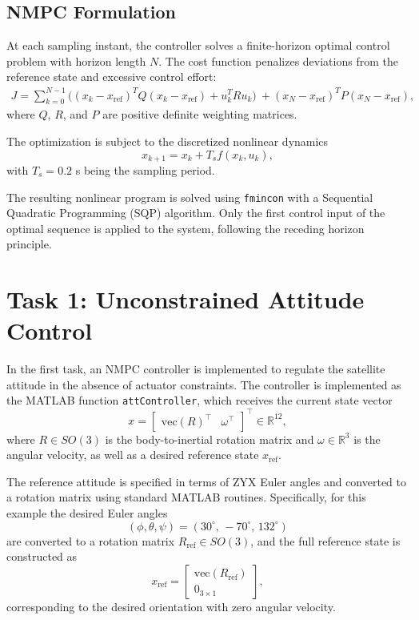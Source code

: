 \documentclass{article}
\begin{document}
\subsection{NMPC Formulation}

At each sampling instant, the controller solves a finite-horizon optimal control problem with horizon length $N$. The cost function penalizes deviations from the reference state and excessive control effort:
\begin{align}
J = \sum_{k=0}^{N-1} \big( (x_k - x_{\text{ref}})^T Q (x_k - x_{\text{ref}}) + u_k^T R u_k \big) \
+ (x_N - x_{\text{ref}})^T P (x_N - x_{\text{ref}}),
\end{align}
where $Q$, $R$, and $P$ are positive definite weighting matrices.

The optimization is subject to the discretized nonlinear dynamics
\begin{equation}
x_{k+1} = x_k + T_s f(x_k,u_k),
\end{equation}
with $T_s = 0.2$ s being the sampling period.

The resulting nonlinear program is solved using \texttt{fmincon} with a Sequential Quadratic Programming (SQP) algorithm. Only the first control input of the optimal sequence is applied to the system, following the receding horizon principle.

\section{Task 1: Unconstrained Attitude Control}

In the first task, an NMPC controller is implemented to regulate the satellite attitude in the absence of actuator constraints. The controller is implemented as the MATLAB function \texttt{attController}, which receives the current state vector
\[
x = \begin{bmatrix} \mathrm{vec}(R)^\top & \omega^\top \end{bmatrix}^\top \in \mathbb{R}^{12},
\]
where $R \in SO(3)$ is the body-to-inertial rotation matrix and $\omega \in \mathbb{R}^3$ is the angular velocity, as well as a desired reference state $x_{\mathrm{ref}}$.

The reference attitude is specified in terms of ZYX Euler angles and converted to a rotation matrix using standard MATLAB routines. Specifically, for this example the desired Euler angles
\[
(\phi,\theta,\psi) = (30^\circ,\,-70^\circ,\,132^\circ)
\]
are converted to a rotation matrix $R_{\mathrm{ref}} \in SO(3)$, and the full reference state is constructed as
\[
x_{\mathrm{ref}} = \begin{bmatrix} \mathrm{vec}(R_{\mathrm{ref}}) \\ 0_{3\times 1} \end{bmatrix},
\]
corresponding to the desired orientation with zero angular velocity.
\end{document}
